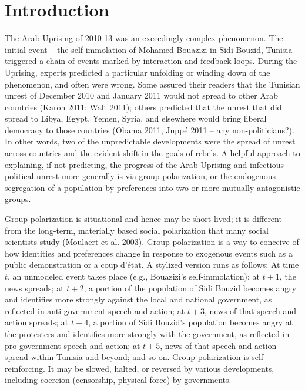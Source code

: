 \documentclass[12pt]{article}
\begin{document}
\section*{Introduction}
The Arab Uprising of 2010-13 was an exceedingly complex phenomenon.  The initial event – the self-immolation of Mohamed Bouazizi in Sidi Bouzid, Tunisia – triggered a chain of events marked by interaction and feedback loops.  During the Uprising, experts predicted a particular unfolding or winding down of the phenomenon, and often were wrong.  Some assured their readers that the Tunisian unrest of December 2010 and January 2011 would not spread to other Arab countries (Karon 2011; Walt 2011); others predicted that the unrest that did spread to Libya, Egypt, Yemen, Syria, and elsewhere would bring liberal democracy to those countries (Obama 2011, Jupp\'{e} 2011 – any non-politicians?).  In other words, two of the unpredictable developments were the spread of unrest across countries and the evident shift in the goals of rebels.  
A helpful approach to explaining, if not predicting, the progress of the Arab Uprising and infectious political unrest more generally is via group polarization, or the endogenous segregation of a population by preferences into two or more mutually antagonistic groups.  

Group polarization is situational and hence may be short-lived; it is different from the long-term, materially based social polarization that many social scientists study (Moulaert et al. 2003).  Group polarization is a way to conceive of how identities and preferences change in response to exogenous events such as a public demonstration or a coup d'\'{e}tat.  A stylized version runs as follows:  At time $t$, an unmodeled event takes place (e.g., Bouazizi's self-immolation); at $t+1$, the news spreads; at $t+2$, a portion of the population of Sidi Bouzid becomes angry and identifies more strongly against the local and national government, as reflected in anti-government speech and action; at $t+3$, news of that speech and action spreads; at $t+4$, a portion of Sidi Bouzid's population becomes angry at the protesters and identifies more strongly with the government, as reflected in pro-government speech and action; at $t+5$, news of that speech and action spread within Tunisia and beyond; and so on.  Group polarization is self-reinforcing.  It may be slowed, halted, or reversed by various developments, including coercion (censorship, physical force) by governments.
\end{document}
